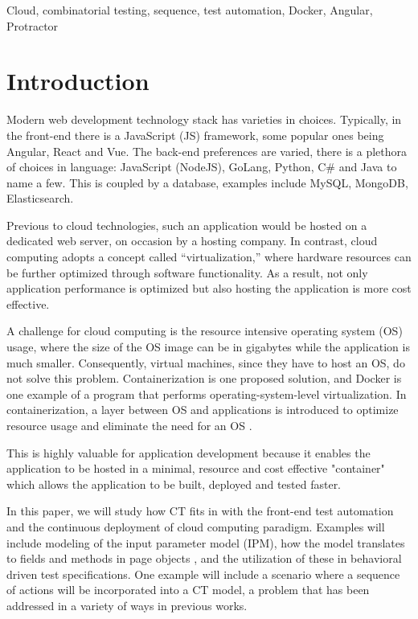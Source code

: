 \documentclass[conference]{IEEEtran}
\begin{document}
\begin{IEEEkeywords}
Cloud, combinatorial testing, sequence, test automation, Docker, Angular, Protractor
\end{IEEEkeywords}

\section{Introduction}
Modern web development technology stack has varieties in choices. 
Typically, in the front-end there is a JavaScript (JS) framework, some popular ones being Angular, React and Vue.
The back-end preferences are varied, there is a plethora of choices in language: JavaScript (NodeJS), GoLang, Python, C\# and Java to name a few. 
This is coupled by a database, examples include MySQL, MongoDB, Elasticsearch.

Previous to cloud technologies, such an application would be hosted on a dedicated web server, on occasion by a hosting company.
In contrast, cloud computing adopts a concept called “virtualization,” where hardware resources can be further optimized through software functionality.
As a result, not only application performance is optimized but also hosting the application is more cost effective.

A challenge for cloud computing is the resource intensive operating system (OS) usage, where the size of the OS image can be in gigabytes while the application is much smaller. 
Consequently, virtual machines, since they have to host an OS, do not solve this problem.
Containerization is one proposed solution, and Docker is one example of a program that performs operating-system-level virtualization. 
In containerization, a layer between OS and applications is introduced to optimize resource usage and eliminate the need for an OS \cite{wiki:docker}.

This is highly valuable for application development because it enables the application to be hosted in a minimal, resource and cost effective "container" which 
allows the application to be built, deployed and tested faster.

In this paper, we will study how CT fits in with the front-end test automation and the continuous deployment of cloud computing paradigm.
Examples will include modeling of the input parameter model (IPM), how the model translates to fields and methods in page objects \cite{fowler:pageobject}, 
and the utilization of these in behavioral driven test specifications.
One example will include a scenario where a sequence of actions will be incorporated into a CT model, a problem that has been addressed in a variety of ways in previous works.
\end{document}
